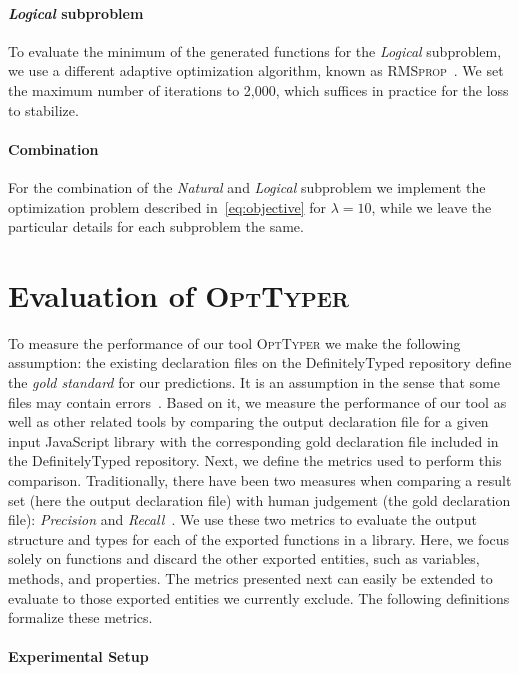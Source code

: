 \documentclass[sigplan,10pt,review,anonymous]{acmart} %
\newcommand{\projectname}{\textsc{OptTyper}\xspace}
\theoremstyle{plain}
\theoremstyle{remark}
\theoremstyle{definition}
\begin{document}
\paragraph{\textit{Logical} subproblem} To evaluate the minimum of the generated functions for the \textit{Logical} subproblem, we use a different adaptive optimization algorithm,
known as \textsc{RMSprop}~\cite{tieleman2014}.
We set the maximum number of iterations to 2,000, which suffices in practice for the loss to stabilize.

\paragraph{Combination} For the combination of the \textit{Natural} and \textit{Logical} subproblem we implement the optimization problem described in~\eqref{eq:objective} for $\lambda = 10$, while we leave the particular details for each subproblem the same. 
\section{Evaluation of \projectname{}}\label{sec:eval}

To measure the performance of our tool \projectname we make the following assumption:
the existing declaration files on the DefinitelyTyped repository define the \textit{gold standard}
for our predictions.
It is an assumption in the sense that some files may contain errors~\citep{williams17}.
Based on it, we measure the performance of our tool as well as other related tools
by comparing the output declaration file for a given input JavaScript library
with the corresponding gold declaration file included in the DefinitelyTyped repository.
Next, we define the metrics used to perform this comparison.
Traditionally, there have been two measures when comparing a result set
(here the output declaration file) with human judgement (the gold declaration file):
\textit{Precision} and \textit{Recall}~\citep{russel16}.
We use these two metrics to evaluate the output structure and types for each of the exported functions in a library.
Here, we focus solely on functions and discard the other exported entities,
such as variables, methods, and properties.
The metrics presented next can easily be extended to evaluate to those exported
entities we currently exclude.
The following definitions formalize these metrics.

\paragraph{Experimental Setup}
\end{document}
